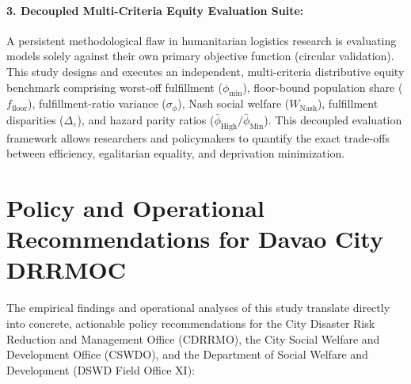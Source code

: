 \paragraph{3. Decoupled Multi-Criteria Equity Evaluation Suite:}
A persistent methodological flaw in humanitarian logistics research is evaluating models solely against their own primary objective function (circular validation). This study designs and executes an independent, multi-criteria distributive equity benchmark comprising worst-off fulfillment ($\phi_{\min}$), floor-bound population share ($f_{\text{floor}}$), fulfillment-ratio variance ($\sigma_\phi$), Nash social welfare ($W_{\text{Nash}}$), fulfillment disparities ($\Delta_\varepsilon$), and hazard parity ratios ($\bar{\phi}_{\text{High}} / \bar{\phi}_{\text{Min}}$). This decoupled evaluation framework allows researchers and policymakers to quantify the exact trade-offs between efficiency, egalitarian equality, and deprivation minimization.


\section{Policy and Operational Recommendations for Davao City DRRMOC}
\label{sec:policy_recommendations}

The empirical findings and operational analyses of this study translate directly into concrete, actionable policy recommendations for the City Disaster Risk Reduction and Management Office (CDRRMO), the City Social Welfare and Development Office (CSWDO), and the Department of Social Welfare and Development (DSWD Field Office XI):

